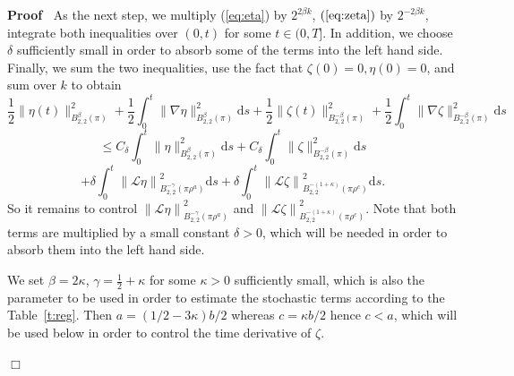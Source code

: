 \documentclass[a4paper,11pt]{article}
\newcommand{\mathd}{\mathrm{d}}
\newenvironment{proof}{\noindent\textbf{Proof\ }}{\hspace*{\fill}$\Box$\medskip}
\numberwithin{equation}{section}
\newcommand{\LL}{\mathscr{L}}
\newcommand{\8}{\infty}
\begin{document}
\begin{proof}
  As the next step, we multiply (\ref{eq:eta}) by $2^{2 \beta k}$,
  $(\ref{eq:zeta})$ by $2^{- 2 \beta k}$, integrate both inequalities over
  $(0, t)$ for some $t \in (0, T]$. In addition, we choose $\delta$
  sufficiently small  in order to absorb some of the
  terms into the left hand side. Finally, we sum the two inequalities, use the
  fact that $\zeta (0) = 0, \eta (0) = 0$, and sum over $k$ to obtain
  \[ \frac{1}{2} \| \eta (t) \|_{B^{\beta}_{2, 2} (\pi)}^2 + \frac{1}{2}\int_0^t \|
     \nabla \eta \|_{B^{\beta}_{2, 2} (\pi)}^2 \mathd s + \frac{1}{2} \| \zeta
     (t) \|_{B^{- \beta}_{2, 2} (\pi)}^2 + \frac{1}{2}\int_0^t \| \nabla \zeta \|_{B^{-
     \beta}_{2, 2} (\pi)}^2 \mathd s \]
  \begin{equation}\label{eq:s1}
    \le C_{\delta} \int_{0}^{t}\| \eta \|^2_{B^{\beta}_{2,2}
     (\pi)}\mathd s +C_{\delta} \int_{0}^{t}\| \zeta \|^2_{B^{-\beta}_{2,2}
     (\pi)}\mathd s 
     \end{equation}
     \begin{equation}+ \delta \int_0^t \left\| \LL \eta \right\|^2_{B^{- \gamma}_{2, 2}
    (\pi \rho^a)} \mathd s + \delta \int_0^t \left\| \LL \zeta \right\|^2_{B^{-
    (1 + \kappa)}_{2, 2} (\pi \rho^c)} \mathd s. \label{eq:s}
  \end{equation}
  So it remains to control $\left\| \LL \eta \right\|^2_{B^{- \gamma}_{2, 2}
  (\pi \rho^a)}$ and $\left\| \LL \zeta \right\|^2_{B^{- (1 + \kappa)}_{2, 2}
  (\pi \rho^c)}$. Note that both terms are multiplied by a small constant
  $\delta > 0$, which will be needed in order to absorb them into the left hand side.
  
 We set $\beta = 2 \kappa$, $\gamma = \frac 12 +\kappa$ for some $\kappa > 0$
  sufficiently small, which is also the parameter to be used in order to
  estimate the stochastic terms according to the Table~\ref{t:reg}. Then $a=(1/2-3\kappa)b/2$ whereas $c=\kappa b/2$
hence  $c<a$, which will be used below in order to control the time derivative of $\zeta$.
  

\end{proof}
\end{document}
